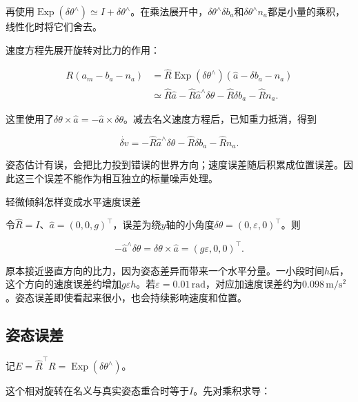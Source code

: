 再使用$\mathop{\mathrm{Exp}}(\delta\theta^\wedge)\simeq I+\delta\theta^\wedge$。在乘法展开中，$\delta\theta^\wedge\delta b_a$和$\delta\theta^\wedge n_a$都是小量的乘积，线性化时将它们舍去。

速度方程先展开旋转对比力的作用：

\begin{equation*}
\begin{aligned}
 R(a_m-b_a-n_a)
 &=\hat R\mathop{\mathrm{Exp}}(\delta\theta^\wedge)(\hat a-\delta b_a-n_a)\\
 &\simeq\hat R\hat a-\hat R\hat a^\wedge\delta\theta
                 -\hat R\delta b_a-\hat Rn_a.
\end{aligned}
\end{equation*}

这里使用了$\delta\theta\times\hat a=-\hat a\times\delta\theta$。减去名义速度方程后，已知重力抵消，得到

\begin{equation*}
\boxed{\dot{\delta v}
       =-\hat R\hat a^\wedge\delta\theta
        -\hat R\delta b_a-\hat Rn_a.}
\end{equation*}

姿态估计有误，会把比力投到错误的世界方向；速度误差随后积累成位置误差。因此这三个误差不能作为相互独立的标量噪声处理。

\begin{bookexample}{轻微倾斜怎样变成水平速度误差}

令$\hat R=I$、$\hat a=(0,0,g)^\top$，误差为绕$y$轴的小角度$\delta\theta=(0,\varepsilon,0)^\top$。则

\begin{equation*}
-\hat a^\wedge\delta\theta
 =\delta\theta\times\hat a=(g\varepsilon,0,0)^\top.
\end{equation*}

原本接近竖直方向的比力，因为姿态差异而带来一个水平分量。一小段时间$h$后，这个方向的速度误差约增加$g\varepsilon h$。若$\varepsilon=0.01\,\mathrm{rad}$，对应加速度误差约为$0.098\,\mathrm{m/s^2}$。姿态误差即使看起来很小，也会持续影响速度和位置。

\end{bookexample}

\subsection{姿态误差}

记$E=\hat R^\top R=\mathop{\mathrm{Exp}}(\delta\theta^\wedge)$。

这个相对旋转在名义与真实姿态重合时等于$I$。先对乘积求导：

